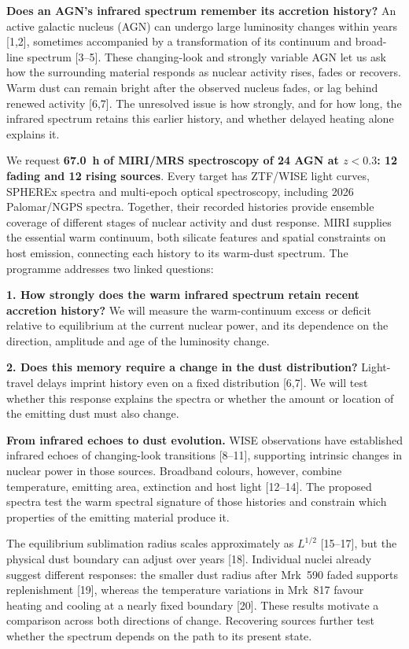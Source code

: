 \documentclass[12pt]{article}
\begin{document}
\scientificjustification

\noindent\textbf{Does an AGN's infrared spectrum remember its accretion history?}
An active galactic nucleus (AGN) can undergo large luminosity changes within years [1,2], sometimes accompanied by a transformation of its continuum and broad-line spectrum [3--5]. These changing-look and strongly variable AGN let us ask how the surrounding material responds as nuclear activity rises, fades or recovers. Warm dust can remain bright after the observed nucleus fades, or lag behind renewed activity [6,7]. The unresolved issue is how strongly, and for how long, the infrared spectrum retains this earlier history, and whether delayed heating alone explains it.

We request \textbf{67.0~h of MIRI/MRS spectroscopy of 24 AGN at $z<0.3$: 12 fading and 12 rising sources}. Every target has ZTF/WISE light curves, SPHEREx spectra and multi-epoch optical spectroscopy, including 2026 Palomar/NGPS spectra. Together, their recorded histories provide ensemble coverage of different stages of nuclear activity and dust response. MIRI supplies the essential warm continuum, both silicate features and spatial constraints on host emission, connecting each history to its warm-dust spectrum. The programme addresses two linked questions:

\noindent\textbf{1. How strongly does the warm infrared spectrum retain recent accretion history?} We will measure the warm-continuum excess or deficit relative to equilibrium at the current nuclear power, and its dependence on the direction, amplitude and age of the luminosity change.

\noindent\textbf{2. Does this memory require a change in the dust distribution?} Light-travel delays imprint history even on a fixed distribution [6,7]. We will test whether this response explains the spectra or whether the amount or location of the emitting dust must also change.

\noindent\textbf{From infrared echoes to dust evolution.}
WISE observations have established infrared echoes of changing-look transitions [8--11], supporting intrinsic changes in nuclear power in those sources. Broadband colours, however, combine temperature, emitting area, extinction and host light [12--14]. The proposed spectra test the warm spectral signature of those histories and constrain which properties of the emitting material produce it.

The equilibrium sublimation radius scales approximately as $L^{1/2}$ [15--17], but the physical dust boundary can adjust over years [18]. Individual nuclei already suggest different responses: the smaller dust radius after Mrk~590 faded supports replenishment [19], whereas the temperature variations in Mrk~817 favour heating and cooling at a nearly fixed boundary [20]. These results motivate a comparison across both directions of change. Recovering sources further test whether the spectrum depends on the path to its present state.
\end{document}
